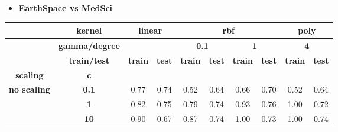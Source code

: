 \documentclass{article}
\theoremstyle{mytheoremstyle}
\theoremstyle{mytheoremstyle}
\theoremstyle{myproblemstyle}
\begin{document}
\begin{itemize}
  \item \textbf{EarthSpace vs MedSci}
\end{itemize}
\begin{longtable}{cccc|cccc|cc}
  \cline{2-10}
  \textbf{}                                                                            & \textbf{kernel}       & \multicolumn{2}{c|}{\textbf{linear}} & \multicolumn{4}{c|}{\textbf{rbf}} & \multicolumn{2}{c}{\textbf{poly}}                                                                                                    \\ \cline{2-10}
  \endfirsthead
  \endhead
  \textbf{}                                                                            & \textbf{gamma/degree} & \multicolumn{2}{c|}{\textbf{}}       & \multicolumn{2}{c}{\textbf{0.1}}  & \multicolumn{2}{c|}{\textbf{1}}   & \multicolumn{2}{c}{\textbf{4}}                                                                   \\ \cline{2-10}
  \textbf{}                                                                            & \textbf{train/test}   & \textbf{train}                       & \textbf{test}                     & \textbf{train}                    & \textbf{test}                  & \textbf{train} & \textbf{test} & \textbf{train} & \textbf{test} \\ \cline{2-10}
  \textbf{scaling}                                                                     & \textbf{c}            & \textbf{}                            & \textbf{}                         & \textbf{}                         & \textbf{}                      & \textbf{}      & \textbf{}     & \textbf{}      & \textbf{}     \\ \hline
  \multirow{3}{*}{\textbf{no scaling}}                                                 & \textbf{0.1}          & 0.77                                 & 0.74                              & 0.52                              & 0.64                           & 0.66           & 0.70          & 0.52           & 0.64          \\ \cline{7-8}
                                                                                       & \textbf{1}            & 0.82                                 & 0.75                              & 0.79                              & \multicolumn{1}{c|}{0.74}      & 0.93           & 0.76          & 1.00           & 0.72          \\ \cline{7-8}
                                                                                       & \textbf{10}           & 0.90                                 & 0.67                              & 0.87                              & 0.74                           & 1.00           & 0.73          & 1.00           & 0.74          \\ \hline

\end{longtable}
\end{document}
